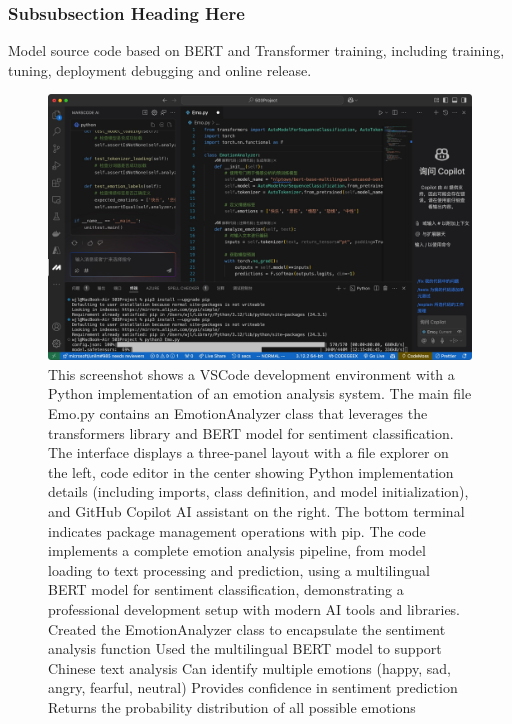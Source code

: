 \documentclass[journal]{IEEEtran}
\begin{document}
\subsubsection{Subsubsection Heading Here}
Model source code based on BERT and Transformer training, including training, tuning, deployment debugging and online release.



\begin{figure}[htb]
    \centering
    \includegraphics[width=\linewidth]{figures/figure_4.jpg}
    \caption{This screenshot shows a VSCode development environment with a Python implementation of an emotion analysis system. The main file Emo.py contains an EmotionAnalyzer class that leverages the transformers library and BERT model for sentiment classification. The interface displays a three-panel layout with a file explorer on the left, code editor in the center showing Python implementation details (including imports, class definition, and model initialization), and GitHub Copilot AI assistant on the right. The bottom terminal indicates package management operations with pip. The code implements a complete emotion analysis pipeline, from model loading to text processing and prediction, using a multilingual BERT model for sentiment classification, demonstrating a professional development setup with modern AI tools and libraries.
    Created the EmotionAnalyzer class to encapsulate the sentiment analysis function
    Used the multilingual BERT model to support Chinese text analysis
    Can identify multiple emotions (happy, sad, angry, fearful, neutral)
    Provides confidence in sentiment prediction
    Returns the probability distribution of all possible emotions}
    \label{fig:my_label}
\end{figure}
\end{document}
